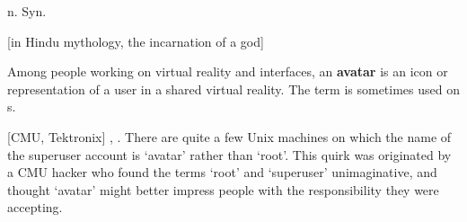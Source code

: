  n. Syn.

[in Hindu mythology, the incarnation of a god]
\begin{inparaenum}
	\item Among people working on virtual reality and  interfaces, an \textbf{avatar} is an icon or representation of
		a user in a shared virtual reality. The term is sometimes used on s.
	\item {[}CMU, Tektronix] , . There are quite a few Unix machines on which the name of the superuser
		account is `avatar' rather than `root'. This quirk was originated by a CMU hacker who found the terms `root' and `superuser'
		unimaginative, and thought `avatar' might better impress people with the responsibility they were accepting.
\end{inparaenum}


